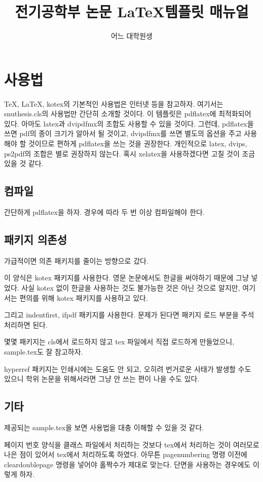 \documentclass[a4paper]{report}
\title{전기공학부 논문 \LaTeX 템플릿 매뉴얼}
\author{어느 대학원생}
\begin{document}
\maketitle

\tableofcontents

\chapter{사용법}
\TeX, \LaTeX, kotex의 기본적인 사용법은 인터넷 등을 참고하자.
여기서는 snuthesis.cls의 사용법만 간단히 소개할 것이다.
이 템플릿은 pdflatex에 최적화되어 있다.
아마도 latex과 dvipdfmx의 조합도 사용할 수 있을 것이다.
그런데, pdflatex을 쓰면 pdf의 종이 크기가 알아서
될 것이고, dvipdfmx를 쓰면 별도의 옵션을 주고 사용해야 할 것이므로
편하게 pdflatex을 쓰는 것을 권장한다.
개인적으로 latex, dvips, ps2pdf의 조합은 별로 권장하지 않는다.
혹시 xelatex을 사용하겠다면 고칠 것이 조금 있을 것 같다.
\section{컴파일}
간단하게 pdflatex을 하자. 경우에 따라 두 번 이상 컴파일해야 한다.
\section{패키지 의존성}
가급적이면 의존 패키지를 줄이는 방향으로 갔다.

이 양식은 kotex 패키지를 사용한다.
영문 논문에서도 한글을 써야하기 때문에 그냥 넣었다.
사실 kotex 없이 한글을 사용하는 것도 불가능한 것은
아닌 것으로 알지만, 여기서는 편의를 위해 kotex 패키지를 사용하고 있다.

그리고 indentfirst, ifpdf 패키지를 사용한다.
문제가 된다면 패키지 로드 부분을 주석처리하면 된다.

몇몇 패키지는 cls에서 로드하지 않고 tex 파일에서
직접 로드하게 만들었으니, sample.tex도 잘 참고하자.

hyperref 패키지는 인쇄시에는 도움도
안 되고, 오히려 번거로운 사태가 발생할 수도 있으니
학위 논문을 위해서라면 그냥 안 쓰는 편이
나을 수도 있다.
\section{기타}
제공되는 sample.tex을 보면
사용법을 대충 이해할 수 있을 것 같다.

페이지 번호 양식을
클래스 파일에서 처리하는 것보다 tex에서
처리하는 것이 여러모로 나은 점이
있어서 tex에서 처리하도록 하였다.
아무튼 pagenumbering 명령 이전에
cleardoublepage 명령을 넣어야
홀짝수가 제대로 맞는다.
단면을 사용하는 경우에도 이렇게 하자.
\end{document}
